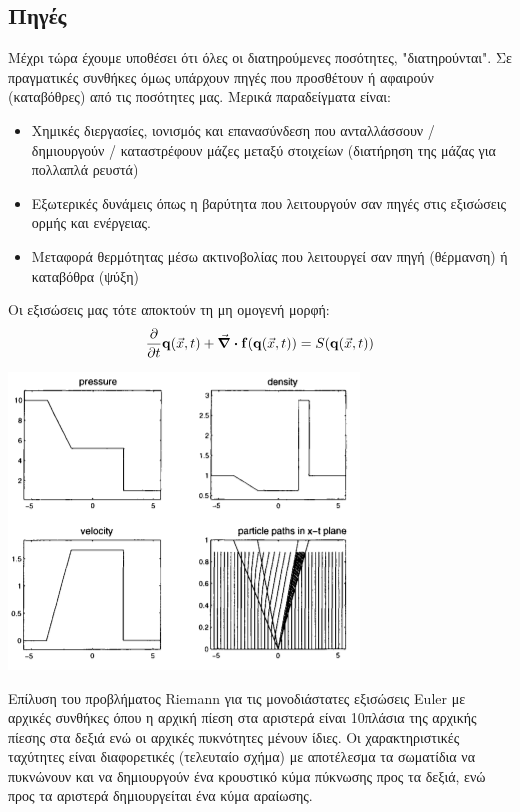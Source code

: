 \documentclass[article,a4paper,11.2pt]{memoir}
\numberwithin{equation}{subsection}
\begin{document}
\subsection{Πηγές}
Μέχρι τώρα έχουμε υποθέσει ότι όλες οι διατηρούμενες ποσότητες, "διατηρούνται". Σε πραγματικές συνθήκες όμως υπάρχουν πηγές που προσθέτουν ή αφαιρούν (καταβόθρες) από τις ποσότητες μας. Μερικά παραδείγματα είναι:
\begin{itemize}
	\item Χημικές διεργασίες, ιονισμός και επανασύνδεση που ανταλλάσσουν / δημιουργούν / καταστρέφουν μάζες μεταξύ στοιχείων (διατήρηση της μάζας για πολλαπλά ρευστά)
	\item Εξωτερικές δυνάμεις όπως η βαρύτητα που λειτουργούν σαν πηγές στις εξισώσεις ορμής και ενέργειας.
	\item Μεταφορά θερμότητας μέσω ακτινοβολίας που λειτουργεί σαν πηγή (θέρμανση) ή καταβόθρα (ψύξη)
\end{itemize}
Οι εξισώσεις μας τότε αποκτούν τη μη ομογενή μορφή:
\begin{equation}
\pdv{t} \mathbf{q}(\vec{x},t) + \div\mathbf{f}(\mathbf{q}(\vec{x},t)) = S(\mathbf{q}(\vec{x},t))
\end{equation}

\begin{marginfigure}
	\label{fig:sodleveque}
	\centering
	\includegraphics[width=1\linewidth]{Images/SODleveque}
	\caption{Επίλυση του προβλήματος Riemann για τις μονοδιάστατες εξισώσεις Euler με αρχικές συνθήκες όπου η αρχική πίεση στα αριστερά είναι 10πλάσια της αρχικής πίεσης στα δεξιά ενώ οι αρχικές πυκνότητες μένουν ίδιες. Οι χαρακτηριστικές ταχύτητες είναι διαφορετικές (τελευταίο σχήμα) με αποτέλεσμα τα σωματίδια να πυκνώνουν και να δημιουργούν ένα κρουστικό κύμα πύκνωσης προς τα δεξιά, ενώ προς τα αριστερά δημιουργείται ένα κύμα αραίωσης. \cite{leveque_computational_1998}}
\end{marginfigure}
\end{document}
